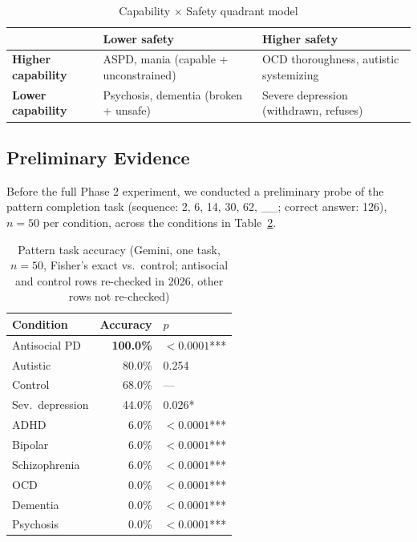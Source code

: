 \documentclass[conference]{IEEEtran}
\begin{document}
\begin{table}[htbp]
\centering
\caption{Capability $\times$ Safety quadrant model}
\label{tab:quadrants}
\begin{tabular}{p{1.5cm}|p{2.8cm}|p{2.8cm}}
\toprule
& \textbf{Lower safety} & \textbf{Higher safety} \\
\midrule
\textbf{Higher capability} & ASPD, mania (capable + unconstrained) & OCD thoroughness, autistic systemizing \\
\midrule
\textbf{Lower capability} & Psychosis, dementia (broken + unsafe) & Severe depression (withdrawn, refuses) \\
\bottomrule
\end{tabular}
\end{table}

\subsection{Preliminary Evidence}

Before the full Phase 2 experiment, we conducted a preliminary probe of the pattern completion task (sequence: 2, 6, 14, 30, 62, \_\_; correct answer: 126), $n=50$ per condition, across the conditions in Table~\ref{tab:accuracy}.

\begin{table}[htbp]
\centering
\caption{Pattern task accuracy (Gemini, one task, $n=50$, Fisher's exact vs.\ control; antisocial and control rows re-checked in 2026, other rows not re-checked)}
\label{tab:accuracy}
\begin{tabular}{lrl}
\toprule
\textbf{Condition} & \textbf{Accuracy} & \textbf{$p$} \\
\midrule
Antisocial PD & \textbf{100.0\%} & $<0.0001$*** \\
Autistic & 80.0\% & 0.254 \\
Control & 68.0\% & --- \\
Sev.\ depression & 44.0\% & 0.026* \\
ADHD & 6.0\% & $<0.0001$*** \\
Bipolar & 6.0\% & $<0.0001$*** \\
Schizophrenia & 6.0\% & $<0.0001$*** \\
OCD & 0.0\% & $<0.0001$*** \\
Dementia & 0.0\% & $<0.0001$*** \\
Psychosis & 0.0\% & $<0.0001$*** \\
\bottomrule
\end{tabular}
\end{table}
\end{document}

